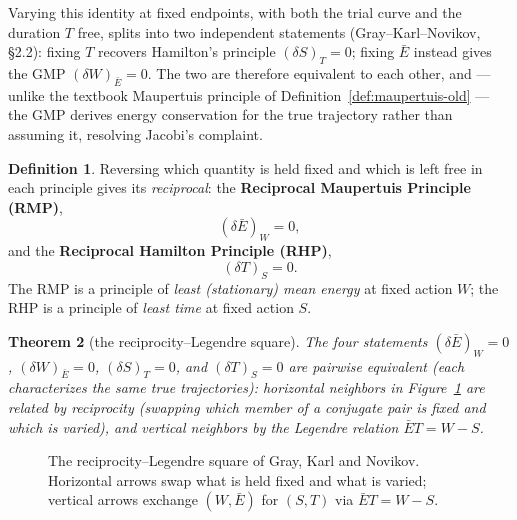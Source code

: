 \documentclass[11pt]{book}
\theoremstyle{definition}
\newtheorem{definition}{Definition}[section]
\theoremstyle{plain}
\newtheorem{theorem}[definition]{Theorem}
\theoremstyle{remark}
\begin{document}
Varying this identity at fixed endpoints, with both the trial curve and the duration $T$ free, splits into two independent statements (Gray--Karl--Novikov, \S2.2): fixing $T$ recovers Hamilton's principle $(\delta S)_T=0$; fixing $\bar E$ instead gives the GMP $(\delta W)_{\bar E}=0$. The two are therefore equivalent to each other, and --- unlike the textbook Maupertuis principle of Definition~\ref{def:maupertuis-old} --- the GMP derives energy conservation for the true trajectory rather than assuming it, resolving Jacobi's complaint.

\begin{definition}
Reversing which quantity is held fixed and which is left free in each principle gives its \emph{reciprocal}: the \textbf{Reciprocal Maupertuis Principle (RMP)},
\[
(\delta \bar E)_W = 0,
\]
and the \textbf{Reciprocal Hamilton Principle (RHP)},
\[
(\delta T)_S = 0 .
\]
The RMP is a principle of \emph{least (stationary) mean energy} at fixed action $W$; the RHP is a principle of \emph{least time} at fixed action $S$.
\end{definition}

\begin{theorem}[the reciprocity--Legendre square]
The four statements $(\delta \bar E)_W=0$, $(\delta W)_{\bar E}=0$, $(\delta S)_T=0$, and $(\delta T)_S=0$ are pairwise equivalent (each characterizes the same true trajectories): horizontal neighbors in Figure~\ref{fig:square} are related by \emph{reciprocity} (swapping which member of a conjugate pair is fixed and which is varied), and vertical neighbors by the \emph{Legendre} relation $\bar ET=W-S$.
\end{theorem}

\begin{figure}[h]
\centering
{}
\caption{The reciprocity--Legendre square of Gray, Karl and Novikov. Horizontal arrows swap what is held fixed and what is varied; vertical arrows exchange $(W,\bar E)$ for $(S,T)$ via $\bar ET=W-S$.}
\label{fig:square}
\end{figure}
\end{document}
